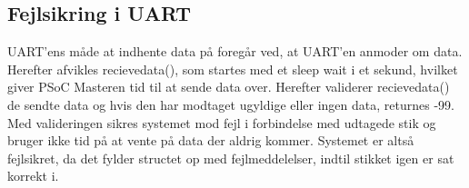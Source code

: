 \subsection{Fejlsikring i UART} 

UART'ens måde at indhente data på foregår ved, at UART'en anmoder om data. Herefter afvikles recievedata(), som startes med et sleep wait i et sekund, hvilket giver PSoC Masteren tid til at sende data over. Herefter validerer recievedata() de sendte data og hvis den har modtaget ugyldige eller ingen data, returnes -99. Med valideringen sikres systemet mod fejl i forbindelse med udtagede stik og bruger ikke tid på at vente på data der aldrig kommer. Systemet er altså fejlsikret, da det fylder structet op med fejlmeddelelser, indtil stikket igen er sat korrekt i.